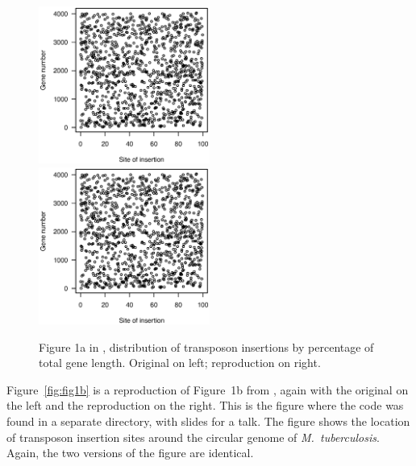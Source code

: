 \begin{figure}
\includegraphics[viewport=133 224 464 528, width=0.50\textwidth]{../original/Nov02/R/Figs/fig1.ps}
\hfill
\includegraphics[viewport=133 224 464 528, width=0.50\textwidth]{../reproduction/Figs/fig1.ps}

\caption{Figure 1a in \citet{lamichhane2003}, distribution of
transposon insertions by percentage of total gene length. Original on left;
reproduction on right.\label{fig:fig1a}}
\end{figure}

Figure~\ref{fig:fig1b} is a reproduction of Figure~1b
from \citet{lamichhane2003}, again with the original on the left and
the reproduction on the right. This is the figure where the code was
found in a separate directory, with slides for a talk. The figure
shows the location of transposon insertion sites around the circular
genome of \emph{M.\ tuberculosis}. Again, the two versions of the
figure are identical.

